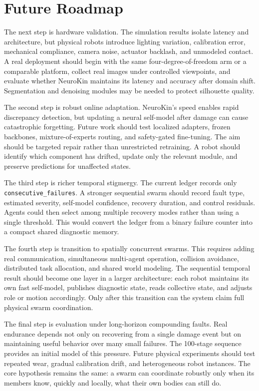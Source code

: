 \documentclass[12pt,a4paper,oneside]{report}
\begin{document}
\section{Future Roadmap}

The next step is hardware validation. The simulation results isolate latency and architecture, but physical robots introduce lighting variation, calibration error, mechanical compliance, camera noise, actuator backlash, and unmodeled contact. A real deployment should begin with the same four-degree-of-freedom arm or a comparable platform, collect real images under controlled viewpoints, and evaluate whether NeuroKin maintains its latency and accuracy after domain shift. Segmentation and denoising modules may be needed to protect silhouette quality.

The second step is robust online adaptation. NeuroKin's speed enables rapid discrepancy detection, but updating a neural self-model after damage can cause catastrophic forgetting. Future work should test localized adapters, frozen backbones, mixture-of-experts routing, and safety-gated fine-tuning. The aim should be targeted repair rather than unrestricted retraining. A robot should identify which component has drifted, update only the relevant module, and preserve predictions for unaffected states.

The third step is richer temporal stigmergy. The current ledger records only \texttt{consecutive\_failures}. A stronger sequential swarm should record fault type, estimated severity, self-model confidence, recovery duration, and control residuals. Agents could then select among multiple recovery modes rather than using a single threshold. This would convert the ledger from a binary failure counter into a compact shared diagnostic memory.

The fourth step is transition to spatially concurrent swarms. This requires adding real communication, simultaneous multi-agent operation, collision avoidance, distributed task allocation, and shared world modeling. The sequential temporal result should become one layer in a larger architecture: each robot maintains its own fast self-model, publishes diagnostic state, reads collective state, and adjusts role or motion accordingly. Only after this transition can the system claim full physical swarm coordination.

The final step is evaluation under long-horizon compounding faults. Real endurance depends not only on recovering from a single damage event but on maintaining useful behavior over many small failures. The 100-stage sequence provides an initial model of this pressure. Future physical experiments should test repeated wear, gradual calibration drift, and heterogeneous robot instances. The core hypothesis remains the same: a swarm can coordinate robustly only when its members know, quickly and locally, what their own bodies can still do.
\end{document}
